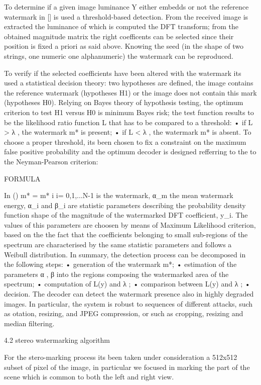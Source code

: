 To determine if a given image luminance Y either embedds or not the reference watermark in [] is used a threshold-based detection.
From the received image is extracted the luminance of which is computed the DFT transform; from the obtained magnitude matrix the right coefficents can be selected since their position is fixed a priori as said above.
Knowing the seed (in the shape of two strings, one numeric one alphanumeric) the watermark can be reproduced.

To verify if the selected coefficients have been altered with the watermark its used a statistical decision theory: two hypotheses are defined, the image contains the reference watermark (hypotheses H1) or the image does not contain this mark (hypotheses H0). Relying on Bayes theory of hypothesis testing, the optimum criterion to test H1 versus H0 is minimum Bayes risk; the test function results to be the likelihood ratio function L that has to be compared to a threshold:
• if L > λ ,  the watermark m* is present;
• if L < λ , the watermark m* is absent.
To choose a proper threshold, its been chosen to fix a constraint on the maximum false positive probability and the optimum decoder is designed refferring to the to the Neyman-Pearson criterion: 

FORMULA

In ()  m* = {m* i } i= 0,1,...N-1 is the watermark, α_m the mean watermark energy, α_i and β_i are statistic parameters describing the probability density function shape of the magnitude of the watermarked DFT coefficient, y_i. 
The values of this parameters are choosen by means of Maximum Likelihood criterion, based on the the fact that the coefficients belonging to small
sub-regions of the spectrum are characterised by the same statistic parameters and follows a Weibull distribution.
In summary, the detection process can be decomposed in
the following steps:
• generation of the watermark m*;
• estimation of the parameters α , β into the regions
composing the watermarked area of the spectrum;
• computation of L(y) and λ ;
• comparison between L(y) and λ ;
• decision.
The decoder can detect the watermark presence also in highly degraded images. In particular, the system is robust to sequences of different attacks, such as otation, resizing, and JPEG compression, or such as cropping, resizing and
median filtering.

4.2 stereo watermarking algorithm

For the stero-marking process its been taken under consideration a 512x512 subset of pixel of the image, in particular we focused in marking the part of the scene which is common to both the left and right view.

